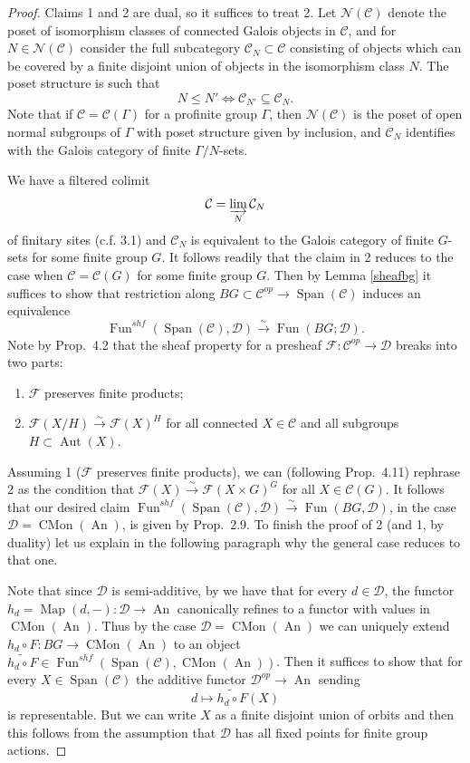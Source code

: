 \documentclass[12pt]{article}
\theoremstyle{definition}
\newcommand{\on}{\operatorname}
\newcommand{\mc}{\mathcal}
\begin{document}
\begin{proof}
Claims 1 and 2 are dual, so it suffices to treat 2.  Let $\mc{N}(\mc{C})$ denote the poset of isomorphism classes of connected Galois objects in $\mc{C}$, and for $N\in\mc{N}(\mc{C})$ consider the full subcategory $\mc{C}_N\subset \mc{C}$ consisting of objects which can be covered by a finite disjoint union of objects in the isomorphism class $N$.  The poset structure is such that
$$N\leq N' \Leftrightarrow \mc{C}_{N'}\subseteq \mc{C}_N.$$
Note that if $\mc{C}=\mc{C}(\Gamma)$ for a profinite group $\Gamma$, then $\mc{N}(\mc{C})$ is the poset of open normal subgroups of $\Gamma$ with poset structure given by inclusion, and $\mc{C}_N$ identifies with the Galois category of finite $\Gamma/N$-sets.

We have a filtered colimit
$$\mc{C} = \varinjlim_N \mc{C}_N$$
of finitary sites (c.f. \cite{cm1} 3.1) and $\mc{C}_N$ is equivalent to the Galois category of finite $G$-sets for some finite group $G$.  It follows readily that the claim in 2 reduces to the case when $\mc{C}=\mc{C}(G)$ for some finite group $G$.  Then by Lemma \ref{sheafbg} it suffices to show that restriction along $BG \subset \mc{C}^{op} \to \on{Span}(\mc{C})$ induces an equivalence
$$\on{Fun}^{shf}(\on{Span}(\mc{C}),\mc{D})\overset{\sim}{\rightarrow}\on{Fun}(BG;\mc{D}).$$
Note by \cite{cm1} Prop.\ 4.2 that the sheaf property for a presheaf $\mc{F}:\mc{C}^{op}\to\mc{D}$ breaks into two parts:
\begin{enumerate}
\item $\mc{F}$ preserves finite products;
\item $\mc{F}(X/H)\overset{\sim}{\rightarrow} \mc{F}(X)^H$ for all connected $X\in\mc{C}$ and all subgroups $H\subset\on{Aut}(X)$.
\end{enumerate}
Assuming 1 ($\mc{F}$ preserves finite products), we can (following \cite{cm1} Prop.\ 4.11) rephrase 2 as the condition that $\mc{F}(X)\overset{\sim}{\rightarrow} \mc{F}(X\times G)^G$ for all $X\in\mc{C}(G)$.  It follows that our desired claim $\on{Fun}^{shf}(\on{Span}(\mc{C}),\mc{D})\overset{\sim}{\rightarrow}\on{Fun}(BG,\mc{D})$, in the case $\mc{D}=\on{CMon}(\on{An})$, is given by \cite{cm2} Prop.\ 2.9.  To finish the proof of 2 (and 1, by duality) let us explain in the following paragraph why the general case reduces to that one.

Note that since $\mc{D}$ is semi-additive, by \cite{gepner} we have that for every $d\in\mc{D}$, the functor $h_d = \on{Map}(d,-):\mc{D} \to \on{An}$ canonically refines to a functor with values in $\on{CMon}(\on{An})$.  Thus by the case $\mc{D}=\on{CMon}(\on{An})$ we can uniquely extend $h_d\circ F: BG \to \on{CMon}(\on{An})$ to an object $\widetilde{h_d\circ F}\in \on{Fun}^{shf}(\on{Span}(\mc{C}),\on{CMon}(\on{An}))$.   Then it suffices to show that for every $X\in\on{Span}(\mc{C})$ the additive functor $\mc{D}^{op}\to \on{An}$ sending
$$d\mapsto \widetilde{h_d\circ F}(X)$$
is representable.  But we can write $X$ as a finite disjoint union of orbits and then this follows from the assumption that $\mc{D}$ has all fixed points for finite group actions.


\end{proof}
\end{document}
